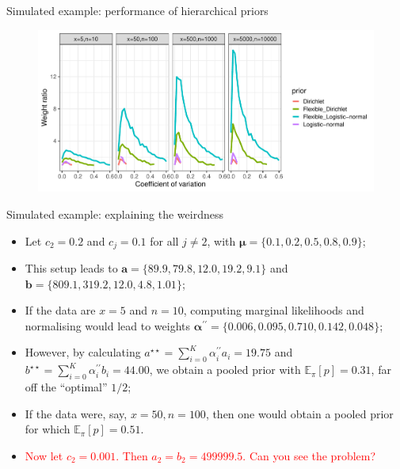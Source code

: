 \begin{frame}{Simulated example: performance of hierarchical priors}
\begin{figure}[!ht]
\begin{center}
\includegraphics[scale=.45]{../../plots/beta_weight_ratios_oneCorrect_MC.pdf}
\end{center}
\label{fig:one_correct_posteriors}
\end{figure}
\end{frame}
\begin{frame}{Simulated example: explaining the weirdness}
\begin{itemize}
 \item Let $c_2 = 0.2$ and $c_j = 0.1$ for all $j \neq 2$, with $\boldsymbol\mu = \{0.1, 0.2, \mathbf{0.5}, 0.8, 0.9\}$;\pause
 \item This setup leads to $\boldsymbol a = \{ 89.9, 79.8, \mathbf{12.0}, 19.2, 9.1\}$ and $\boldsymbol b = \{809.1, 319.2, \mathbf{12.0}, 4.8, 1.01\} $;\pause
 \item If the data are $x = 5$ and $n = 10$, computing marginal likelihoods and normalising would lead to weights $\boldsymbol\alpha^{\prime\prime} = \{0.006, 0.095, \mathbf{0.710}, 0.142, 0.048\}$;\pause
 \item However, by calculating $a^{\star\star} = \sum_{i = 0}^K \alpha_i^{\prime\prime} a_i = 19.75$ and $b^{\star\star} =  \sum_{i = 0}^K \alpha_i^{\prime\prime} b_i = 44.00$, we obtain a pooled prior with $\mathbb{E}_\pi [p] =  0.31$, far off the ``optimal'' $1/2$;\pause
 \item If the data were, say, $x = 50, n = 100$, then one would obtain a pooled prior for which $\mathbb{E}_\pi [p] = 0.51$.\pause
 \item [\textcolor{red}{\textbullet}] \textcolor{red}{ Now let $c_2 = 0.001$. Then $a_2 = b_2 = 499999.5$. Can you see the problem?}
\end{itemize}
\end{frame}

